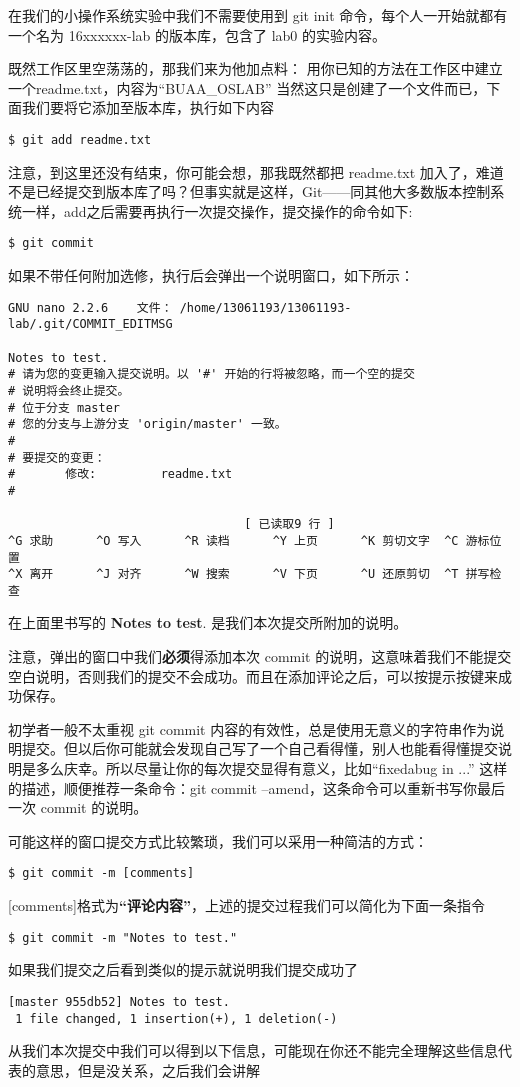 \begin{note}
在我们的小操作系统实验中我们不需要使用到 git init 命令，每个人一开始就都有一个名为 16xxxxxx-lab 的版本库，包含了 lab0 的实验内容。
\end{note}
既然工作区里空荡荡的，那我们来为他加点料：
用你已知的方法在工作区中建立一个readme.txt，内容为“BUAA\_OSLAB”
当然这只是创建了一个文件而已，下面我们要将它添加至版本库，执行如下内容
\begin{verbatim}
$ git add readme.txt
\end{verbatim}
注意，到这里还没有结束，你可能会想，那我既然都把 readme.txt 加入了，难道不是已经提交到版本库了吗？但事实就是这样，Git——同其他大多数版本控制系统一样，add之后需要再执行一次提交操作，提交操作的命令如下:
\begin{verbatim}
$ git commit
\end{verbatim}
如果不带任何附加选修，执行后会弹出一个说明窗口，如下所示：
\begin{verbatim}
GNU nano 2.2.6    文件： /home/13061193/13061193-lab/.git/COMMIT_EDITMSG              

Notes to test.
# 请为您的变更输入提交说明。以 '#' 开始的行将被忽略，而一个空的提交
# 说明将会终止提交。
# 位于分支 master
# 您的分支与上游分支 'origin/master' 一致。
#
# 要提交的变更：
#       修改:         readme.txt
#

                                 [ 已读取9 行 ]
^G 求助      ^O 写入      ^R 读档      ^Y 上页      ^K 剪切文字  ^C 游标位置
^X 离开      ^J 对齐      ^W 搜索      ^V 下页      ^U 还原剪切  ^T 拼写检查
\end{verbatim}
在上面里书写的 \textbf{Notes to test}. 是我们本次提交所附加的说明。

注意，弹出的窗口中我们\textbf{必须}得添加本次 commit 的说明，这意味着我们不能提交空白说明，否则我们的提交不会成功。而且在添加评论之后，可以按提示按键来成功保存。

\begin{note}
初学者一般不太重视 git commit 内容的有效性，总是使用无意义的字符串作为说明提交。但以后你可能就会发现自己写了一个自己看得懂，别人也能看得懂提交说明是多么庆幸。所以尽量让你的每次提交显得有意义，比如“fixedabug in ...” 这样的描述，顺便推荐一条命令：git commit --amend，这条命令可以重新书写你最后一次 commit 的说明。
\end{note}

可能这样的窗口提交方式比较繁琐，我们可以采用一种简洁的方式：
\begin{verbatim}
$ git commit -m [comments]
\end{verbatim}
[comments]格式为\textbf{“评论内容”}，上述的提交过程我们可以简化为下面一条指令
\begin{verbatim}
$ git commit -m "Notes to test."
\end{verbatim}
如果我们提交之后看到类似的提示就说明我们提交成功了
\begin{verbatim}
[master 955db52] Notes to test.
 1 file changed, 1 insertion(+), 1 deletion(-)
\end{verbatim}
从我们本次提交中我们可以得到以下信息，可能现在你还不能完全理解这些信息代表的意思，但是没关系，之后我们会讲解

